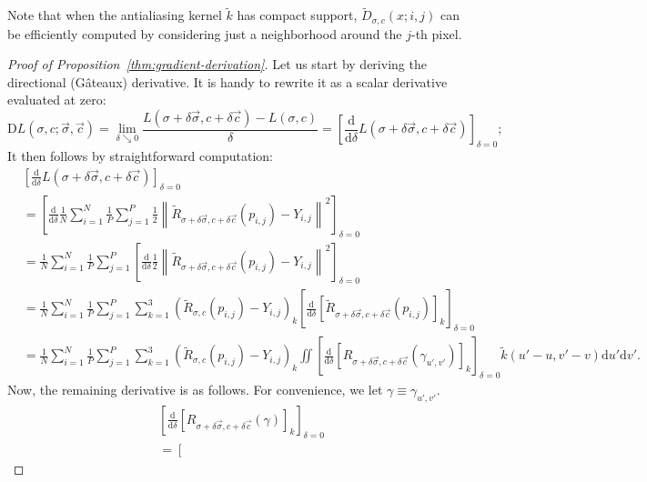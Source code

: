 \documentclass{article}
\newcommand{\D}{\mathrm{D}}
\newcommand{\dif}{\mathrm{d}}
\newcommand\norm[1]{\left\lVert#1\right\rVert}
\newcommand{\render}{{R}}
\begin{document}
Note that when the antialiasing kernel $\widetilde{k}$ has compact support, $\widetilde{D}_{\sigma,c}(x; i,j)$ can be efficiently computed by considering just a neighborhood around the $j$-th pixel.


\begin{proof}[Proof of Proposition~\ref{thm:gradient-derivation}]
    Let us start by deriving the directional (Gâteaux) derivative.
    It is handy to rewrite it as a scalar derivative evaluated at zero:
    \[
        \D L(\sigma, c; \vec{\sigma}, \vec{c})
        = \lim_{\delta \searrow 0} \frac{L(\sigma + \delta \vec{\sigma}, c + \delta \vec{c}) - L(\sigma, c)}{\delta}
        = \left[ \frac{\dif}{\dif \delta} L(\sigma + \delta \vec{\sigma}, c + \delta \vec{c}) \right]_{\delta=0};
    \]
    It then follows by straightforward computation:
    \begin{align*}
        & \left[ \frac{\dif}{\dif \delta} L(\sigma + \delta \vec{\sigma}, c + \delta \vec{c}) \right]_{\delta=0}
        \\ &= \left[ \frac{\dif}{\dif \delta} \frac{1}{N} \sum_{i=1}^N \frac{1}{P} \sum_{j=1}^P \frac{1}{2} \norm{ \widetilde{\render}_{\sigma + \delta \vec{\sigma}, c + \delta \vec{c}}(p_{i,j}) - Y_{i,j} }^2 \right]_{\delta=0}
        \\ &= \frac{1}{N} \sum_{i=1}^N \frac{1}{P} \sum_{j=1}^P \left[ \frac{\dif}{\dif \delta} \frac{1}{2} \norm{ \widetilde{\render}_{\sigma + \delta \vec{\sigma}, c + \delta \vec{c}}(p_{i,j}) - Y_{i,j} }^2 \right]_{\delta=0}
        \\ &= \frac{1}{N} \sum_{i=1}^N \frac{1}{P} \sum_{j=1}^P \sum_{k=1}^3 ( \widetilde{\render}_{\sigma,c}(p_{i,j}) - Y_{i,j} )_k \left[ \frac{\dif}{\dif \delta} [\widetilde{\render}_{\sigma + \delta \vec{\sigma}, c + \delta \vec{c}}(p_{i,j})]_k \right]_{\delta=0}
        \\ &= \frac{1}{N} \sum_{i=1}^N \frac{1}{P} \sum_{j=1}^P \sum_{k=1}^3 ( \widetilde{\render}_{\sigma,c}(p_{i,j}) - Y_{i,j} )_k \iint \left[ \frac{\dif}{\dif \delta} [\render_{\sigma+\delta \vec{\sigma},c+\delta \vec{c}}(\gamma_{u',v'})]_k \right]_{\delta=0} \widetilde{k}(u' - u, v' - v) \dif u' \dif v'.
    \end{align*}
    Now, the remaining derivative is as follows. For convenience, we let $\gamma \equiv \gamma_{u',v'}$.
    {\small
    \begin{align*}
        & \left[ \frac{\dif}{\dif \delta} [\render_{\sigma + \delta \vec{\sigma}, c + \delta \vec{c}}(\gamma)]_k \right]_{\delta=0}
        \\ &= \left[

\end{align*}}
\end{proof}
\end{document}
